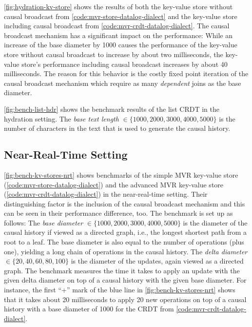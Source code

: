 

\ref{fig:hydration-kv-store} shows the results of both the key-value store
without causal broadcast from \ref{code:mvr-store-datalog-dialect} and the
key-value store including causal broadcast from \ref{code:mvr-crdt-datalog-dialect}.
The causal broadcast mechanism has a significant impact on the performance:
While an increase of the base diameter by 1000 causes the performance of the
key-value store without causal broadcast to increase by about two milliseconds,
the key-value store's performance including causal broadcast increases by about
40 milliseconds.
The reason for this behavior is the costly fixed point iteration of the causal
broadcast mechanism which require as many \emph{dependent} joins as the
base diameter.



\ref{fig:bench-list-hdr} shows the benchmark results of the list \ac{CRDT}
in the hydration setting.
The \emph{base text length} \(\in \{1000, 2000, 3000, 4000, 5000\}\) is the number of
characters in the text that is used to generate the causal history.

\subsection{Near-Real-Time Setting}\label{sec:bench-nrt}



\ref{fig:bench-kv-stores-nrt} shows benchmarks of the simple \ac{MVR} key-value
store (\ref{code:mvr-store-datalog-dialect}) and the advanced \ac{MVR} key-value
store (\ref{code:mvr-crdt-datalog-dialect}) in the near-real-time
setting.
Their distinguishing factor is the inclusion of the causal broadcast mechanism
and this can be seen in their performance difference, too.
The benchmark is set up as follows:
The \emph{base diameter} \(\in \{1000, 2000, 3000, 4000, 5000\}\) is the diameter
of the causal history if viewed as a directed graph,
i.e., the longest shortest path from a root to a leaf.
The base diameter is also equal to the number of operations (plus one),
yielding a long chain of operations in the causal history.
The \emph{delta diameter} \(\in \{20, 40, 60, 80, 100\}\) is the diameter of the
updates, again viewed as a directed graph.
The benchmark measures the time it takes to apply an update with the given
delta diameter on top of a causal history with the given base diameter.
For instance, the first ``+'' mark of the blue line in
\ref{fig:bench-kv-stores-nrt} shows that it takes about 20 milliseconds
to apply 20 new operations on top of a causal history with a base diameter of
1000 for the CRDT from \ref{code:mvr-crdt-datalog-dialect}.

